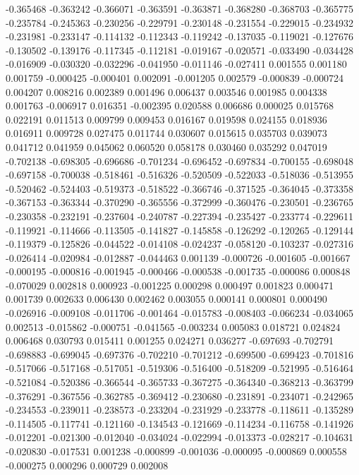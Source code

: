 -0.365468
-0.363242
-0.366071
-0.363591
-0.363871
-0.368280
-0.368703
-0.365775
-0.235784
-0.245363
-0.230256
-0.229791
-0.230148
-0.231554
-0.229015
-0.234932
-0.231981
-0.233147
-0.114132
-0.112343
-0.119242
-0.137035
-0.119021
-0.127676
-0.130502
-0.139176
-0.117345
-0.112181
-0.019167
-0.020571
-0.033490
-0.034428
-0.016909
-0.030320
-0.032296
-0.041950
-0.011146
-0.027411
0.001555
0.001180
0.001759
-0.000425
-0.000401
0.002091
-0.001205
0.002579
-0.000839
-0.000724
0.004207
0.008216
0.002389
0.001496
0.006437
0.003546
0.001985
0.004338
0.001763
-0.006917
0.016351
-0.002395
0.020588
0.006686
0.000025
0.015768
0.022191
0.011513
0.009799
0.009453
0.016167
0.019598
0.024155
0.018936
0.016911
0.009728
0.027475
0.011744
0.030607
0.015615
0.035703
0.039073
0.041712
0.041959
0.045062
0.060520
0.058178
0.030460
0.035292
0.047019
-0.702138
-0.698305
-0.696686
-0.701234
-0.696452
-0.697834
-0.700155
-0.698048
-0.697158
-0.700038
-0.518461
-0.516326
-0.520509
-0.522033
-0.518036
-0.513955
-0.520462
-0.524403
-0.519373
-0.518522
-0.366746
-0.371525
-0.364045
-0.373358
-0.367153
-0.363344
-0.370290
-0.365556
-0.372999
-0.360476
-0.230501
-0.236765
-0.230358
-0.232191
-0.237604
-0.240787
-0.227394
-0.235427
-0.233774
-0.229611
-0.119921
-0.114666
-0.113505
-0.141827
-0.145858
-0.126292
-0.120265
-0.129144
-0.119379
-0.125826
-0.044522
-0.014108
-0.024237
-0.058120
-0.103237
-0.027316
-0.026414
-0.020984
-0.012887
-0.044463
0.001139
-0.000726
-0.001605
-0.001667
-0.000195
-0.000816
-0.001945
-0.000466
-0.000538
-0.001735
-0.000086
0.000848
-0.070029
0.002818
0.000923
-0.001225
0.000298
0.000497
0.001823
0.000471
0.001739
0.002633
0.006430
0.002462
0.003055
0.000141
0.000801
0.000490
-0.026916
-0.009108
-0.011706
-0.001464
-0.015783
-0.008403
-0.066234
-0.034065
0.002513
-0.015862
-0.000751
-0.041565
-0.003234
0.005083
0.018721
0.024824
0.006468
0.030793
0.015411
0.001255
0.024271
0.036277
-0.697693
-0.702791
-0.698883
-0.699045
-0.697376
-0.702210
-0.701212
-0.699500
-0.699423
-0.701816
-0.517066
-0.517168
-0.517051
-0.519306
-0.516400
-0.518209
-0.521995
-0.516464
-0.521084
-0.520386
-0.366544
-0.365733
-0.367275
-0.364340
-0.368213
-0.363799
-0.376291
-0.367556
-0.362785
-0.369412
-0.230680
-0.231891
-0.234071
-0.242965
-0.234553
-0.239011
-0.238573
-0.233204
-0.231929
-0.233778
-0.118611
-0.135289
-0.114505
-0.117741
-0.121160
-0.134543
-0.121669
-0.114234
-0.116758
-0.141926
-0.012201
-0.021300
-0.012040
-0.034024
-0.022994
-0.013373
-0.028217
-0.104631
-0.020830
-0.017531
0.001238
-0.000899
-0.001036
-0.000095
-0.000869
0.000558
-0.000275
0.000296
0.000729
0.002008
